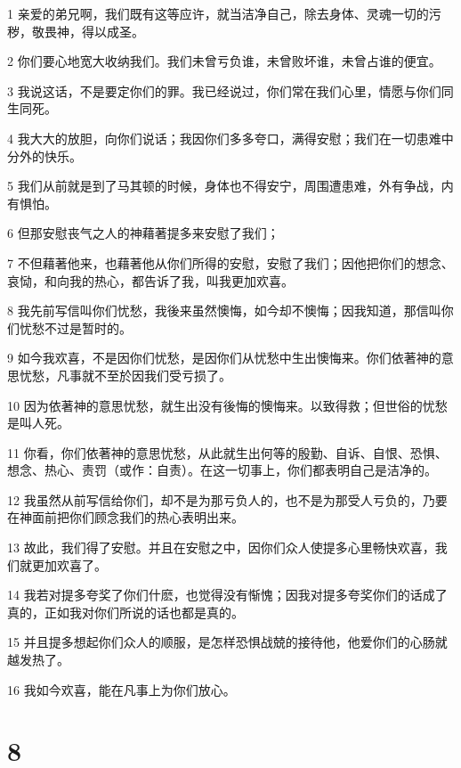 \par 1 亲爱的弟兄啊，我们既有这等应许，就当洁净自己，除去身体、灵魂一切的污秽，敬畏神，得以成圣。
\par 2 你们要心地宽大收纳我们。我们未曾亏负谁，未曾败坏谁，未曾占谁的便宜。
\par 3 我说这话，不是要定你们的罪。我已经说过，你们常在我们心里，情愿与你们同生同死。
\par 4 我大大的放胆，向你们说话；我因你们多多夸口，满得安慰；我们在一切患难中分外的快乐。
\par 5 我们从前就是到了马其顿的时候，身体也不得安宁，周围遭患难，外有争战，内有惧怕。
\par 6 但那安慰丧气之人的神藉著提多来安慰了我们；
\par 7 不但藉著他来，也藉著他从你们所得的安慰，安慰了我们；因他把你们的想念、哀恸，和向我的热心，都告诉了我，叫我更加欢喜。
\par 8 我先前写信叫你们忧愁，我後来虽然懊悔，如今却不懊悔；因我知道，那信叫你们忧愁不过是暂时的。
\par 9 如今我欢喜，不是因你们忧愁，是因你们从忧愁中生出懊悔来。你们依著神的意思忧愁，凡事就不至於因我们受亏损了。
\par 10 因为依著神的意思忧愁，就生出没有後悔的懊悔来。以致得救；但世俗的忧愁是叫人死。
\par 11 你看，你们依著神的意思忧愁，从此就生出何等的殷勤、自诉、自恨、恐惧、想念、热心、责罚（或作：自责）。在这一切事上，你们都表明自己是洁净的。
\par 12 我虽然从前写信给你们，却不是为那亏负人的，也不是为那受人亏负的，乃要在神面前把你们顾念我们的热心表明出来。
\par 13 故此，我们得了安慰。并且在安慰之中，因你们众人使提多心里畅快欢喜，我们就更加欢喜了。
\par 14 我若对提多夸奖了你们什麽，也觉得没有惭愧；因我对提多夸奖你们的话成了真的，正如我对你们所说的话也都是真的。
\par 15 并且提多想起你们众人的顺服，是怎样恐惧战兢的接待他，他爱你们的心肠就越发热了。
\par 16 我如今欢喜，能在凡事上为你们放心。

\chapter{8}

